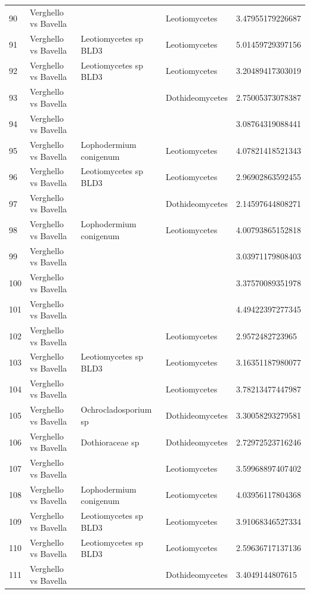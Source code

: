 \documentclass[12pt]{article}\usepackage[]{graphicx}\usepackage[]{color}
\numberwithin{figure}{section}
\begin{document}
\begin{table}[ht]
\begin{tabular}{lllll}
  90 & Verghello vs Bavella &  & Leotiomycetes & 3.47955179226687 \\ 
  91 & Verghello vs Bavella & Leotiomycetes sp BLD3 & Leotiomycetes & 5.01459729397156 \\ 
  92 & Verghello vs Bavella & Leotiomycetes sp BLD3 & Leotiomycetes & 3.20489417303019 \\ 
  93 & Verghello vs Bavella &  & Dothideomycetes & 2.75005373078387 \\ 
  94 & Verghello vs Bavella &  &  & 3.08764319088441 \\ 
  95 & Verghello vs Bavella & Lophodermium conigenum & Leotiomycetes & 4.07821418521343 \\ 
  96 & Verghello vs Bavella & Leotiomycetes sp BLD3 & Leotiomycetes & 2.96902863592455 \\ 
  97 & Verghello vs Bavella &  & Dothideomycetes & 2.14597644808271 \\ 
  98 & Verghello vs Bavella & Lophodermium conigenum & Leotiomycetes & 4.00793865152818 \\ 
  99 & Verghello vs Bavella &  &  & 3.03971179808403 \\ 
  100 & Verghello vs Bavella &  &  & 3.37570089351978 \\ 
  101 & Verghello vs Bavella &  &  & 4.49422397277345 \\ 
  102 & Verghello vs Bavella &  & Leotiomycetes & 2.9572482723965 \\ 
  103 & Verghello vs Bavella & Leotiomycetes sp BLD3 & Leotiomycetes & 3.16351187980077 \\ 
  104 & Verghello vs Bavella &  & Leotiomycetes & 3.78213477447987 \\ 
  105 & Verghello vs Bavella & Ochrocladosporium sp & Dothideomycetes & 3.30058293279581 \\ 
  106 & Verghello vs Bavella & Dothioraceae sp & Dothideomycetes & 2.72972523716246 \\ 
  107 & Verghello vs Bavella &  & Leotiomycetes & 3.59968897407402 \\ 
  108 & Verghello vs Bavella & Lophodermium conigenum & Leotiomycetes & 4.03956117804368 \\ 
  109 & Verghello vs Bavella & Leotiomycetes sp BLD3 & Leotiomycetes & 3.91068346527334 \\ 
  110 & Verghello vs Bavella & Leotiomycetes sp BLD3 & Leotiomycetes & 2.59636717137136 \\ 
  111 & Verghello vs Bavella &  & Dothideomycetes & 3.4049144807615 \\ 

\end{tabular}
\end{table}
\end{document}
